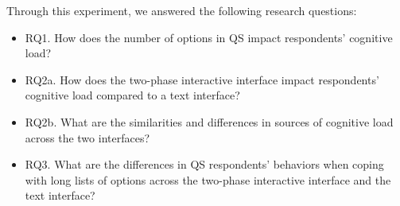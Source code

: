 Through this experiment, we answered the following research questions:

\begin{itemize}
    \item RQ1. How does the number of options in QS impact respondents' cognitive load?
    \item RQ2a. How does the two-phase interactive interface impact respondents' cognitive load compared to a text interface?
    \item RQ2b. What are the similarities and differences in sources of cognitive load across the two interfaces?
    \item RQ3. What are the differences in QS respondents' behaviors when coping with long lists of options across the two-phase interactive interface and the text interface?
\end{itemize}






